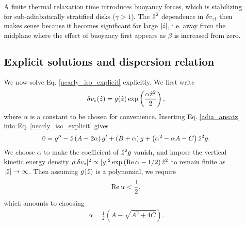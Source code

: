 

A finite thermal relaxation time introduces buoyancy
forces, which is stabilizing for sub-adiabatically stratified disks
($\gamma > 1$). The $\hat{z}^2$ dependence in $\delta v_{z1}$ then makes
sense because it becomes significant for large $|\hat{z}|$, i.e. away from
the midplane where the effect of buoyancy first appears as $\beta$ is
increased from zero. 

\subsection{Explicit solutions and dispersion relation}\label{disp_relax}
We now solve Eq. \ref{nearly_iso_explicit} explicitly. We first write  
\begin{align}
  \delta v_z(\hat{z}) =
  g(\hat{z})\exp\left(\frac{\alpha\hat{z}^2}{2}\right), \label{adia_ansatz}
\end{align}
where $\alpha$ is a constant to be chosen for convenience. Inserting
Eq. \ref{adia_ansatz} into Eq. \ref{nearly_iso_explicit} gives
\begin{align}
  0 = g^{\prime\prime} - \hat{z}\left(A - 2\alpha\right)g^\prime + \left(B +
    \alpha\right)g
  +\left(\alpha^2 - \alpha A - C\right)\hat{z}^2 g.
\end{align}
We choose $\alpha$ to make the coefficient of $\hat{z}^2g$
vanish, and impose the vertical kinetic energy density
$\rho|\delta v_z|^2\propto |g|^2 \exp{\left(\operatorname{Re}\alpha -
    1/2\right)\hat{z}^2}$ to remain finite as $|\hat{z}|\to\infty$. 
Then assuming $g(\hat{z})$ is a polynomial, we require  
\begin{align}
  \operatorname{Re}\alpha < \frac{1}{2}, 
\end{align}
which amounts to choosing 
\begin{align}
  \alpha = \frac{1}{2}\left(A - \sqrt{A^2 + 4C}\right).  
\end{align} 

